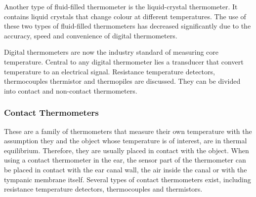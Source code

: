 \medskip
Another type of fluid-filled thermometer is the liquid-crystal thermometer. It contains liquid crystals that change colour at different temperatures. The use of these two types of fluid-filled thermometers has decreased significantly due to the accuracy, speed and convenience of digital thermometers.

\medskip
Digital thermometers are now the industry standard of measuring core temperature. Central to any digital thermometer lies a transducer that convert temperature to an electrical signal. Resistance temperature detectors, thermocouples thermistor and thermopiles are discussed. They can be divided into contact and non-contact thermometers.

\subsubsection{Contact Thermometers}
These are a family of thermometers that measure their own temperature with the assumption they and the object whose temperature is of interest, are in thermal equilibrium. Therefore, they are usually placed in contact with the object. When using a contact thermometer in the ear, the sensor part of the thermometer can be placed in contact with the ear canal wall, the air inside the canal or with the tympanic membrane itself. Several types of contact thermometers exist, including resistance temperature detectors, thermocouples and thermistors.

